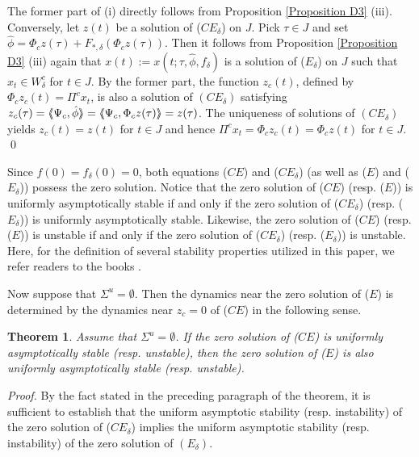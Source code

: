 \documentclass[12pt]{amsart}
\newtheorem{Thm}{Theorem}
\begin{document}
The former part of (i) directly follows from 
Proposition \ref{Proposition D3} (iii). Conversely, let $z(t)$ be a 
solution of ($CE_\delta$) on $J$. Pick $\tau\in J$ and set 
$\hat\phi= \Phi_c z(\tau)+F_{\ast,\delta}(\Phi_c z(\tau))$. 
Then it follows from Proposition \ref{Proposition D3} (iii) again that 
$x(t):=x(t;\tau,\hat\phi,f_\delta)$ is a solution of ($E_\delta$) on 
$J$ such that $x_t\in W^c_\delta$ for $t\in J$. By the former part, 
the function $z_c(t)$, defined by $\Phi_cz_c(t)=\Pi^c x_t$, is also 
a solution of $(CE_\delta)$ satisfying 
$z_c(\tau)={\langle\hspace{-1mm}\langle} \Psi_c, \hat\phi{\rangle\hspace{-1mm}\rangle}= {\langle\hspace{-1mm}\langle} \Psi_c, \Phi_c z(\tau){\rangle\hspace{-1mm}\rangle} =z(\tau)$. 
The uniqueness of solutions of $(CE_\delta)$ yields $z_c(t)=z(t)$ for 
$t\in J$ and hence $\Pi^c x_t=\Phi_cz_c(t)= \Phi_c z(t)$ for $t\in J$. 
\qed

\vskip 5mm

Since $f(0)=f_{\delta}(0)=0$, both equations ($CE$) and ($CE_\delta$) 
(as well as ($E$) and ($E_\delta$)) possess the zero solution.  
Notice that the zero solution of ($CE$) (resp. ($E$)) is uniformly 
asymptotically stable if and only if the zero solution of 
($CE_{\delta}$) (resp. ($E_\delta$)) is uniformly asymptotically stable. 
Likewise, the zero solution of ($CE$) (resp. ($E$)) is unstable 
if and only if the zero solution of ($CE_{\delta}$) (resp. ($E_\delta$)) 
is unstable. Here, for the definition of several stability properties 
utilized in this paper, we  refer readers to the books \cite{yos, hen}. 

Now suppose that $\Sigma^u=\emptyset$. Then the dynamics near the 
zero solution of ($E$) is determined by the dynamics near $z_c=0$ of 
($CE$) in the following sense.  

\begin{Thm}\label{Theorem D3} Assume that $\Sigma^u=\emptyset$. 
If the zero solution of ($CE$) is uniformly asymptotically stable 
(resp. unstable), then the zero solution of ($E$) is also 
uniformly asymptotically stable (resp. unstable). 
\end{Thm}

\noindent
{\it Proof.} By the fact stated in the preceding paragraph of the 
theorem, it is sufficient to establish that the uniform asymptotic 
stability (resp. instability) of the zero solution of ($CE_{\delta}$) 
implies the uniform asymptotic stability (resp. instability) of 
the zero solution of $(E_\delta)$. 
\end{document}
